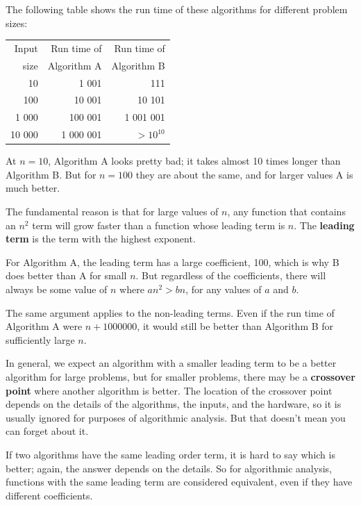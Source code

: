 \documentclass[10pt]{book}
\begin{document}
The following table shows the run time of these algorithms
for different problem sizes:

\begin{tabular}{|r|r|r|}
\hline
Input     &   Run time of     & Run time of \\
size      &   Algorithm A     & Algorithm B \\
\hline
10        &   1 001           & 111         \\
100       &   10 001          & 10 101         \\
1 000     &   100 001         & 1 001 001         \\
10 000    &   1 000 001       & $> 10^{10}$         \\
\hline
\end{tabular}

At $n=10$, Algorithm A looks pretty bad; it takes almost 10 times
longer than Algorithm B.  But for $n=100$ they are about the same, and
for larger values A is much better.

The fundamental reason is that for large values of $n$, any function
that contains an $n^2$ term will grow faster than a function whose
leading term is $n$.  The {\bf leading term} is the term with the
highest exponent.

For Algorithm A, the leading term has a large coefficient, 100, which
is why B does better than A for small $n$.  But regardless of the
coefficients, there will always be some value of $n$ where
$a n^2 > b n$, for any values of $a$ and $b$.

The same argument applies to the non-leading terms.  Even if the run
time of Algorithm A were $n+1000000$, it would still be better than
Algorithm B for sufficiently large $n$.

In general, we expect an algorithm with a smaller leading term to be a
better algorithm for large problems, but for smaller problems, there
may be a {\bf crossover point} where another algorithm is better.  The
location of the crossover point depends on the details of the
algorithms, the inputs, and the hardware, so it is usually ignored for
purposes of algorithmic analysis.  But that doesn't mean you can forget
about it.

If two algorithms have the same leading order term, it is hard to say
which is better; again, the answer depends on the details.  So for
algorithmic analysis, functions with the same leading term
are considered equivalent, even if they have different coefficients.
\end{document}
